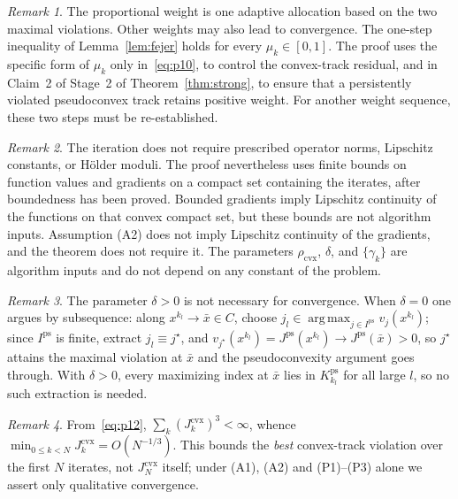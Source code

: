 \documentclass[]{interact}
\theoremstyle{plain}
\theoremstyle{definition}
\theoremstyle{remark}
\newtheorem{remark}{Remark}
\DeclareMathOperator*{\argmax}{arg\,max}
\newcommand{\cvx}{\mathrm{cvx}}
\newcommand{\ps}{\mathrm{ps}}
\begin{document}
\begin{remark}\label{rem:weight-scope}
The proportional weight is one adaptive allocation based on the two maximal violations. Other weights may also lead to convergence. The one-step inequality of Lemma~\ref{lem:fejer} holds for every $\mu_k\in[0,1]$. The proof uses the specific form of $\mu_k$ only in~\eqref{eq:p10}, to control the convex-track residual, and in Claim~2 of Stage~2 of Theorem~\ref{thm:strong}, to ensure that a persistently violated pseudoconvex track retains positive weight. For another weight sequence, these two steps must be re-established.
\end{remark}

\begin{remark}\label{rem:regularity-scope}
The iteration does not require prescribed operator norms, Lipschitz constants, or H\"older moduli. The proof nevertheless uses finite bounds on function values and gradients on a compact set containing the iterates, after boundedness has been proved. Bounded gradients imply Lipschitz continuity of the functions on that convex compact set, but these bounds are not algorithm inputs. Assumption (A2) does not imply Lipschitz continuity of the gradients, and the theorem does not require it. The parameters $\rho_{\cvx}$, $\delta$, and $\{\gamma_k\}$ are algorithm inputs and do not depend on any constant of the problem.
\end{remark}

\begin{remark}\label{rem:delta-role}
The parameter $\delta>0$ is not necessary for convergence. When $\delta=0$ one argues by subsequence: along $x^{k_l}\to\bar x\in C$, choose $j_l\in\argmax_{j\in I^{\ps}}v_j(x^{k_l})$; since $I^{\ps}$ is finite, extract $j_l\equiv j^\star$, and $v_{j^\star}(x^{k_l})=J^{\ps}(x^{k_l})\to J^{\ps}(\bar x)>0$, so $j^\star$ attains the maximal violation at $\bar x$ and the pseudoconvexity argument goes through. With $\delta>0$, every maximizing index at $\bar x$ lies in $K^{\ps}_{k_l}$ for all large $l$, so no such extraction is needed.
\end{remark}

\begin{remark}\label{rem:rate}
From~\eqref{eq:p12}, $\sum_k(J^{\cvx}_k)^3<\infty$, whence $\min_{0\le k<N}J^{\cvx}_k=O(N^{-1/3})$. This bounds the \emph{best} convex-track violation over the first $N$ iterates, not $J^{\cvx}_N$ itself; under (A1), (A2) and (P1)--(P3) alone we assert only qualitative convergence.
\end{remark}
\end{document}

